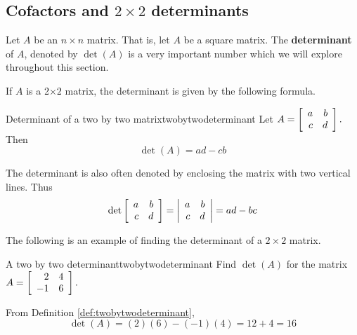 \subsection{Cofactors and \texorpdfstring{$2\times 2$}{2x2} determinants}

Let $A$ be an $n\times n$ matrix. That is, let $A$ be a square matrix. The \textbf{determinant} of $A$, denoted
by $\det \left( A\right) $ is a very important number which we will explore throughout this section. 

If $A$ is a 2$\times 2$
matrix, the determinant is given by the following formula.

\begin{definition}{Determinant of a two by two matrix}{twobytwodeterminant}
Let $A=\left[
\begin{array}{rr}
a & b \\
c & d
\end{array}
\right] .$ Then
\begin{equation*}
\det \left( A\right)  = ad-cb
\end{equation*}
\end{definition}

The determinant is also often denoted by enclosing the matrix with two
vertical lines. Thus
\begin{equation*}
\det \left[
\begin{array}{rr}
a & b \\
c & d
\end{array}
\right] =\left|
\begin{array}{rr}
a & b \\
c & d
\end{array}
\right| 
=ad - bc
\end{equation*}

The following is an example of finding the determinant of a $2 \times 2$ matrix.

\begin{example}{A two by two determinant}{twobytwodeterminant}
Find $\det\left(A\right) $ for the matrix
$A =  \left[
\begin{array}{rr}
2 & 4 \\
-1 & 6
\end{array}
\right] .$
\end{example}

\begin{solution} From Definition \ref{def:twobytwodeterminant},
\begin{equation*}
\det \left( A\right) = \left( 2\right) \left( 6\right) -\left(
-1\right) \left( 4\right) = 12 + 4 = 16
\end{equation*}
\end{solution} 

